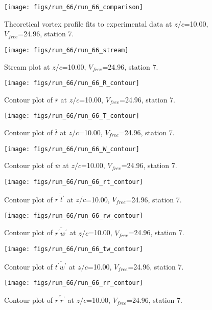 \begin{figure}[H]
\centering
\texttt{[image: figs/run\_66/run\_66\_comparison]}
\caption{Theoretical vortex profile fits to experimental data at $z/c$=10.00, $V_{free}$=24.96, station 7.}
\end{figure}


\begin{figure}[H]
\centering
\texttt{[image: figs/run\_66/run\_66\_stream]}
\caption{Stream plot at $z/c$=10.00, $V_{free}$=24.96, station 7.}
\end{figure}


\begin{figure}[H]
\centering
\texttt{[image: figs/run\_66/run\_66\_R\_contour]}
\caption{Contour plot of $\overline{r}$ at $z/c$=10.00, $V_{free}$=24.96, station 7.}
\end{figure}


\begin{figure}[H]
\centering
\texttt{[image: figs/run\_66/run\_66\_T\_contour]}
\caption{Contour plot of $\overline{t}$ at $z/c$=10.00, $V_{free}$=24.96, station 7.}
\end{figure}


\begin{figure}[H]
\centering
\texttt{[image: figs/run\_66/run\_66\_W\_contour]}
\caption{Contour plot of $\overline{w}$ at $z/c$=10.00, $V_{free}$=24.96, station 7.}
\end{figure}


\begin{figure}[H]
\centering
\texttt{[image: figs/run\_66/run\_66\_rt\_contour]}
\caption{Contour plot of $\overline{r^\prime t^\prime}$ at $z/c$=10.00, $V_{free}$=24.96, station 7.}
\end{figure}


\begin{figure}[H]
\centering
\texttt{[image: figs/run\_66/run\_66\_rw\_contour]}
\caption{Contour plot of $\overline{r^\prime w^\prime}$ at $z/c$=10.00, $V_{free}$=24.96, station 7.}
\end{figure}


\begin{figure}[H]
\centering
\texttt{[image: figs/run\_66/run\_66\_tw\_contour]}
\caption{Contour plot of $\overline{t^\prime w^\prime}$ at $z/c$=10.00, $V_{free}$=24.96, station 7.}
\end{figure}


\begin{figure}[H]
\centering
\texttt{[image: figs/run\_66/run\_66\_rr\_contour]}
\caption{Contour plot of $\overline{r^\prime r^\prime}$ at $z/c$=10.00, $V_{free}$=24.96, station 7.}
\end{figure}


